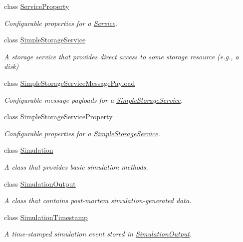\begin{DoxyCompactItemize}
class \hyperlink{classwrench_1_1_service_property}{Service\+Property}
\begin{DoxyCompactList}\small\item\em Configurable properties for a \hyperlink{classwrench_1_1_service}{Service}. \end{DoxyCompactList}\item 
class \hyperlink{classwrench_1_1_simple_storage_service}{Simple\+Storage\+Service}
\begin{DoxyCompactList}\small\item\em A storage service that provides direct access to some storage resource (e.\+g., a disk) \end{DoxyCompactList}\item 
class \hyperlink{classwrench_1_1_simple_storage_service_message_payload}{Simple\+Storage\+Service\+Message\+Payload}
\begin{DoxyCompactList}\small\item\em Configurable message payloads for a \hyperlink{classwrench_1_1_simple_storage_service}{Simple\+Storage\+Service}. \end{DoxyCompactList}\item 
class \hyperlink{classwrench_1_1_simple_storage_service_property}{Simple\+Storage\+Service\+Property}
\begin{DoxyCompactList}\small\item\em Configurable properties for a \hyperlink{classwrench_1_1_simple_storage_service}{Simple\+Storage\+Service}. \end{DoxyCompactList}\item 
class \hyperlink{classwrench_1_1_simulation}{Simulation}
\begin{DoxyCompactList}\small\item\em A class that provides basic simulation methods. \end{DoxyCompactList}\item 
class \hyperlink{classwrench_1_1_simulation_output}{Simulation\+Output}
\begin{DoxyCompactList}\small\item\em A class that contains post-\/mortem simulation-\/generated data. \end{DoxyCompactList}\item 
class \hyperlink{classwrench_1_1_simulation_timestamp}{Simulation\+Timestamp}
\begin{DoxyCompactList}\small\item\em A time-\/stamped simulation event stored in \hyperlink{classwrench_1_1_simulation_output}{Simulation\+Output}. \end{DoxyCompactList}\item 

\end{DoxyCompactItemize}
